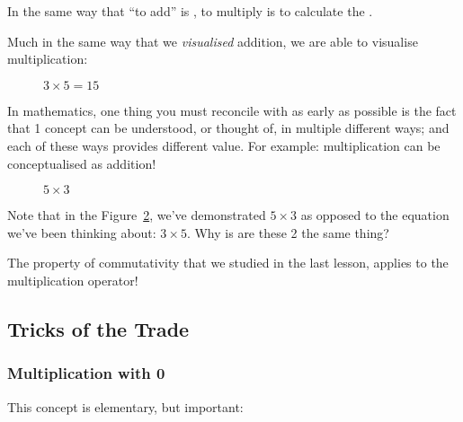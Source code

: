 In the same way that \enquote{to add} is \fillin[to sum], to multiply is to calculate the \fillin[product].

Much in the same way that we \emph{visualised} addition, we are able to visualise multiplication:

\begin{figure}[ht]
    \label{fig:m1}
    \centering
    \caption{$3\times 5 = 15$ }
\end{figure}

In mathematics, one thing you must reconcile with as early as possible is the fact that 1 concept can be understood, or thought of, in multiple different ways; and each of these ways provides different value. 
For example: multiplication can be conceptualised as addition!

\begin{figure}[ht]
    \label{fig:m2}
    \centering

    \caption{$5\times 3$}
\end{figure}

Note that in the Figure~\ref{fig:m2}, we've demonstrated $5\times 3$ as opposed to the equation we've been thinking about: $3\times 5$. Why is are these 2 the same thing?
\begin{solutionordottedlines}[1in]
    The property of commutativity that we studied in the last lesson, applies to the multiplication operator!
\end{solutionordottedlines}


\subsection{Tricks of the Trade}
\subsubsection{Multiplication with 0}
This concept is elementary, but important:

